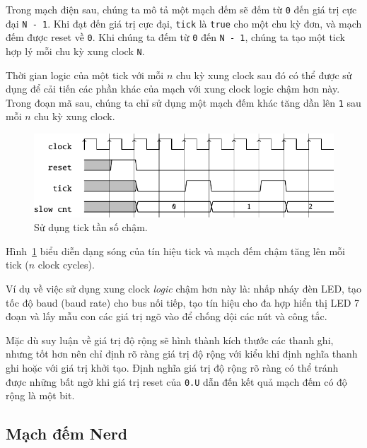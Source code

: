 \documentclass[%
    10pt,
    headinclude, footexclude,
    openright, %
    notitlepage,
    cleardoubleempty,
    headsepline,
    pointlessnumbers,
    bibtotoc, idxtotoc,
    ]{scrbook}
\newcommand{\code}[1]{{\small{\texttt{#1}}}}
\begin{document}
Trong mạch điện sau, chúng ta mô tả một mạch đếm sẽ đếm từ \code{0}
đến giá trị cực đại \code{N - 1}. Khi đạt đến giá trị cực đại,
\code{tick} là \code{true} cho một chu kỳ đơn, và mạch đếm được reset về \code{0}.
Khi chúng ta đếm từ \code{0} đến \code{N - 1}, chúng ta tạo một tick hợp lý mỗi chu kỳ xung clock \code{N}.


\noindent Thời gian logic của một tick với mỗi $n$ chu kỳ xung clock sau đó có thể được sử dụng để cải tiến các phần khác của mạch với xung clock logic chậm hơn này. Trong đoạn mã sau, chúng ta chỉ sử dụng một mạch đếm khác tăng dần lên \code{1} sau mỗi $n$ chu kỳ xung clock. 


\begin{figure}
  \centering
  \includegraphics[scale=1]{figures/tick_count_wave}
  \caption{Sử dụng tick tần số chậm.}
  \label{fig:tick-count-wave}
\end{figure}

\noindent Hình~\ref{fig:tick-count-wave} biểu diễn dạng sóng của tín hiệu tick và mạch đếm chậm tăng lên mỗi tick ($n$ clock cycles).

Ví dụ về việc sử dụng xung clock \emph{logic} chậm hơn này là: nhấp nháy đèn LED, tạo tốc độ baud (baud rate) cho bus nối tiếp, tạo tín hiệu cho đa hợp hiển thị LED 7 đoạn và lấy mẫu con các giá trị ngõ vào để chống dội các nút và công tắc.

Mặc dù suy luận về giá trị độ rộng sẽ hình thành kích thước các thanh ghi, nhưng tốt hơn nên chỉ định rõ ràng giá trị độ rộng với kiểu khi định nghĩa thanh ghi hoặc với giá trị khởi tạo. Định nghĩa giá trị độ rộng rõ ràng có thể tránh được những bất ngờ khi giá trị reset của \code {0.U} dẫn đến kết quả mạch đếm có độ rộng là một bit. 

\subsection{Mạch đếm Nerd}
\end{document}
